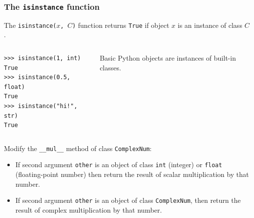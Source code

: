 \documentclass[english,serif,mathserif,xcolor=pdftex,dvipsnames,table]{beamer}
\begin{document}
\begin{frame}[fragile]
  \frametitle{The \texttt{isinstance} function}
  The \texttt{isinstance($x$, $C$)} function returns \texttt{True} if
  object $x$ is an instance of class $C$.

  \+
  \begin{columns}
    \begin{column}{0.5\textwidth}
\begin{lstlisting}
>>> isinstance(1, int)
True
>>> isinstance(0.5, float)
True
>>> isinstance("hi!", str)
True
\end{lstlisting}
    \end{column}
    \begin{column}{0.5\textwidth}
      \raggedleft
      Basic Python objects are instances of built-in classes.
    \end{column}
  \end{columns}
\end{frame}


\begin{frame}[fragile]
  \begin{exercise}
    Modify the \lstinline|__mul__| method of class \texttt{ComplexNum}:
    \begin{itemize}
    \item If second argument \texttt{other} is an object of class
      \texttt{int} (integer) or \texttt{float} (floating-point
      number) then return the result of scalar multiplication by that number.
    \item If second argument \texttt{other} is an object of class
      \texttt{ComplexNum}, then return the result of complex
      multiplication by that number.
    \end{itemize}
  \end{exercise}
\end{frame}




\end{document}
